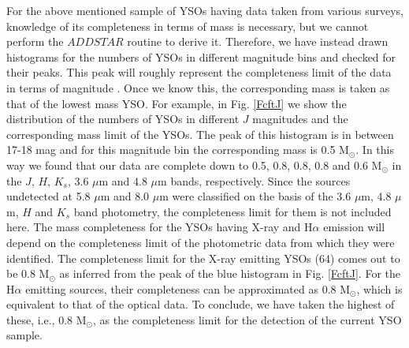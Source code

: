 \documentclass[a4paper,fleqn,usenatbib,useAMS]{mnras}
\begin{document}
For the above mentioned sample of YSOs having data taken from various surveys, knowledge of its
completeness in terms of mass is necessary, but we cannot perform the $ADDSTAR$ 
routine to derive it.
Therefore, we have instead drawn histograms for the numbers of YSOs in different magnitude bins and checked for their peaks.
This peak will roughly represent the completeness limit of the data in terms of magnitude \citep{2013MNRAS.432.3445J,2013ApJ...778...96W,2016ApJ...822...49J,2016AJ....151..126S}. 
Once we know this, the corresponding mass is taken as that of the lowest mass YSO.
For example, in Fig. \ref{FcftJ} we show the distribution of the numbers of YSOs in different $J$ magnitudes and the
corresponding mass limit of the YSOs.
The peak of this histogram is in between 17-18 mag and for this magnitude bin 
the corresponding mass is 0.5 M$_\odot$.
In this way we found that our data are complete down to 0.5, 0.8, 0.8, 0.8 and 0.6 M$_\odot$ in the $J$, $H$, $K_s$, 
3.6 $\mu$m and 4.8 $\mu$m bands, respectively.
Since the sources undetected at 5.8 $\mu$m and 8.0 $\mu$m were classified on the 
basis of the 3.6 $\mu$m, 4.8 $\mu$m,  $H$ and $K_s$ band photometry, 
the completeness limit for them is not included here.
The mass completeness for the YSOs having X-ray and H$\alpha$ emission  will depend on the 
completeness limit of the photometric data from which they were identified.
The completeness limit for the X-ray emitting YSOs (64) comes out to be
0.8 M$_\odot$ as inferred from the peak of the blue histogram in Fig. \ref{FcftJ}. 
For the H$\alpha$ emitting sources, their completeness can be approximated as 0.8 M$_\odot$, which is 
equivalent to that of the optical data. 
To conclude, we have taken the highest of these, i.e., 0.8 M$_\odot$, as the completeness limit 
for the detection of the current YSO sample.
\end{document}
